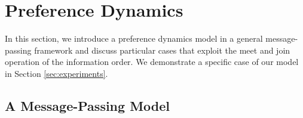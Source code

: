 \documentclass[conference]{ieeeconf}
\renewcommand{\succeq}{\succcurlyeq}
\newcommand{\A}{\mathcal{A}}
\newcommand{\Pref}{\mathsf{Pre}}
\newtheorem{remark}{Remark}
\begin{document}



\vspace{-0.5em}
\section{Preference Dynamics}
\label{sec:dynamics}
\vspace{-0.5em}

In this section, we introduce a preference dynamics model in a general message-passing framework and discuss particular cases that exploit the meet and join operation of the information order.
We demonstrate a specific case of our model in Section \ref{sec:experiments}.

\vspace{-0.25em}
\subsection{A Message-Passing Model}
\vspace{-0.25em}
\end{document}
